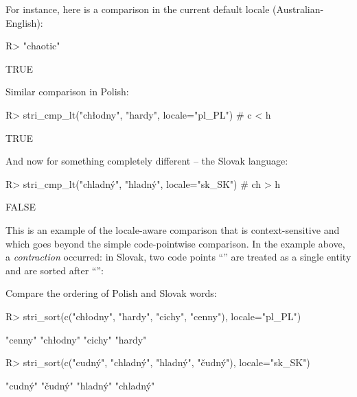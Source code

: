 \documentclass[nojss]{jss}
\begin{document}

For instance, here is a comparison in the current default locale
(Australian-English):

\begin{Schunk}
\begin{Sinput}
R> "chaotic" %s<% "hard"  # c < h
\end{Sinput}
\begin{Soutput}
[1] TRUE
\end{Soutput}
\end{Schunk}

Similar comparison in Polish:

\begin{Schunk}
\begin{Sinput}
R> stri_cmp_lt("chłodny", "hardy", locale="pl_PL")  # c < h
\end{Sinput}
\begin{Soutput}
[1] TRUE
\end{Soutput}
\end{Schunk}

And now for something completely different -- the Slovak language:

\begin{Schunk}
\begin{Sinput}
R> stri_cmp_lt("chladný", "hladný", locale="sk_SK") # ch > h
\end{Sinput}
\begin{Soutput}
[1] FALSE
\end{Soutput}
\end{Schunk}



This is an example of the locale-aware comparison that is context-sensitive
and which goes beyond the simple code-pointwise comparison.
In the example above, a \textit{contraction} occurred:
in Slovak,
two code points ``'' are treated as a single entity
and are sorted after ``'':


Compare the ordering of Polish and Slovak words:

\begin{Schunk}
\begin{Sinput}
R> stri_sort(c("chłodny", "hardy", "cichy", "cenny"), locale="pl_PL")
\end{Sinput}
\begin{Soutput}
[1] "cenny"   "chłodny" "cichy"   "hardy"
\end{Soutput}
\begin{Sinput}
R> stri_sort(c("cudný", "chladný", "hladný", "čudný"), locale="sk_SK")
\end{Sinput}
\begin{Soutput}
[1] "cudný"   "čudný"   "hladný"  "chladný"
\end{Soutput}
\end{Schunk}
\end{document}

